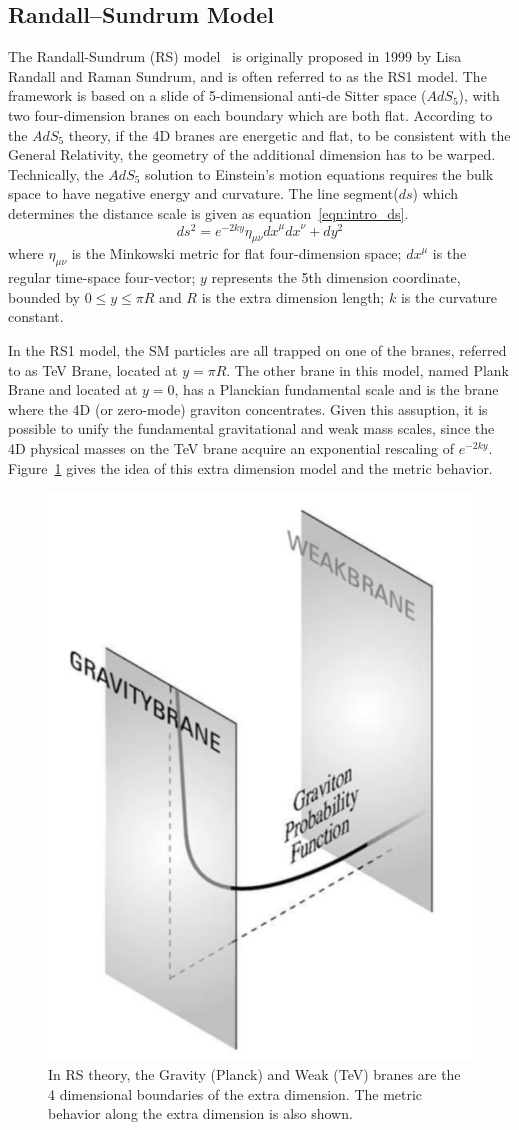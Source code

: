 \subsection{Randall–Sundrum Model}
The Randall-Sundrum (RS) model~\cite{Intro_RS1} is originally proposed in 1999 by Lisa Randall and Raman Sundrum, and is often referred to as the RS1 model. The framework is based on a slide of 5-dimensional anti-de Sitter space ($AdS_{5}$), with two four-dimension branes on each boundary which are both flat. According to the $AdS_{5}$ theory, if the 4D branes are energetic and flat, to be consistent with the General Relativity, the geometry of the additional dimension has to be warped. Technically, the $AdS_{5}$ solution to Einstein's motion equations requires the bulk space to have negative energy and curvature. The line segment($ds$) which determines the distance scale is given as equation~\ref{eqn:intro_ds}.
\begin{equation}
ds^2 = e^{-2ky}{\eta}_{\mu\nu}{dx}^{\mu}{dx}^{\nu}+dy^2
\label{eqn:intro_ds}
\end{equation}
where ${\eta}_{\mu\nu}$ is the Minkowski metric for flat four-dimension space; ${dx}^{\mu}$ is the regular time-space four-vector; $y$ represents the 5th dimension coordinate, bounded by $0\leq y \leq \pi R$ and $R$ is the extra dimension length; $k$ is the curvature constant.

\vspace{0.3cm}
In the RS1 model, the SM particles are all trapped on one of the branes, referred to as TeV Brane, located at $y=\pi R$. The other brane in this model, named Plank Brane and located at $y=0$, has a Planckian fundamental scale and is the brane where the 4D (or zero-mode) graviton concentrates. Given this assuption, it is possible to unify the fundamental gravitational and weak mass scales, since the 4D physical masses on the TeV brane acquire an exponential rescaling of $e^{-2ky}$. Figure~\ref{fig:intro_branes} gives the idea of this extra dimension model and the metric behavior.
\begin{figure}[htbp]
\begin{center}
\includegraphics[width=0.32\linewidth]{figures/intro_branes.png}
\caption{In RS theory, the Gravity (Planck) and Weak (TeV) branes are the 4 dimensional boundaries of the extra dimension. The metric behavior along the extra dimension is also shown.}
\label{fig:intro_branes}
\end{center}
\end{figure}

